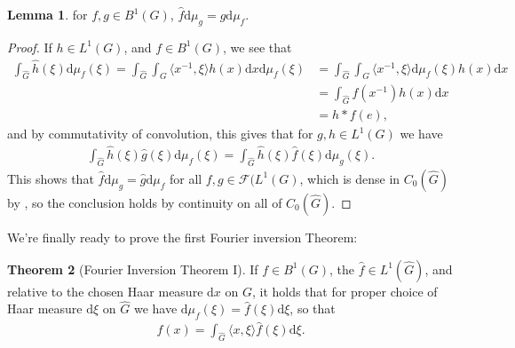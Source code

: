 \documentclass[10pt,twoside,openany,final]{memoir}
\theoremstyle{definition}
\newtheorem{theorem}{Theorem}[chapter]
\newtheorem{lemma}[theorem]{Lemma}
\theoremstyle{Break}
\newcommand{\F}{\mathcal{F}}
\newcommand{\G}{\widehat{G}}
\renewcommand{\d}{\mathrm{d}}
\begin{document}
\begin{lemma}
	for $f,g \in B^1(G)$, $\widehat{f} \d \mu_g=\widehat{g}\d \mu_f$.
	\label{4.20}
\end{lemma}
\begin{proof}
	If $h \in L^1(G)$, and $f \in B^1(G)$, we see that
	\begin{align*}
		\int_{\G} \widehat{h}(\xi) \d \mu_f(\xi) = \int_{\G} \int_G \langle x^{-1}, \xi \rangle h(x) \d x \d \mu_f(\xi)&= \int_{\G} \int_G \langle x^{-1},\xi \rangle \d \mu_f(\xi) h(x) \d x\\
		&= \int_{\G} f(x^{-1}) h(x) \d x\\
		&= h \ast f(e),
	\end{align*}
	and by commutativity of convolution, this gives that for $g,h \in L^1(G)$ we have
	\begin{align*}
		\int_{\G} \widehat{h}(\xi) \widehat{g}(\xi) \d \mu_{f}(\xi)= \int_{\G} \widehat{h}(\xi) \widehat{f}(\xi) \d \mu_{g}(\xi).
	\end{align*}
	This shows that $\widehat{f} \d \mu_g=\widehat{g}\d \mu_f$ for all $f,g \in \F(L^1(G)$, which is dense in $C_0(\G)$ by , so the conclusion holds by continuity on all of $C_0(\G)$.
\end{proof}
We're finally ready to prove the first Fourier inversion Theorem:
\begin{theorem}[Fourier Inversion Theorem I]
	If $f \in B^1(G)$, the $\widehat{f} \in L^1(\G)$, and relative to the chosen Haar measure $\d x$ on $G$, it holds that for proper choice of Haar measure $\d \xi$ on $\G$ we have $\d \mu_f( \xi)=\widehat{f}(\xi) \d \xi$, so that
	\begin{align*}
		f(x) = \int_{\G} \langle x, \xi\rangle \widehat{f}(\xi) \d \xi.
	\end{align*}
	\label{4.21}
\end{theorem}
\end{document}
